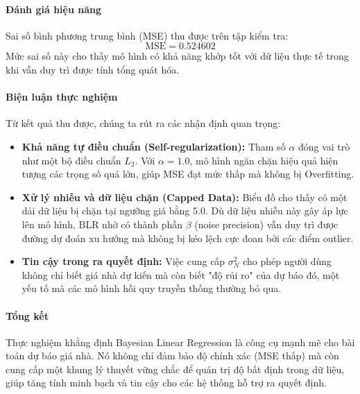 \paragraph{Đánh giá hiệu năng}

Sai số bình phương trung bình (MSE) thu được trên tập kiểm tra:
\[
\text{MSE} = 0.524602
\]
Mức sai số này cho thấy mô hình có khả năng khớp tốt với dữ liệu thực tế trong khi vẫn duy trì được tính tổng quát hóa.

\paragraph{Biện luận thực nghiệm}

Từ kết quả thu được, chúng ta rút ra các nhận định quan trọng:
\begin{itemize}
    \item \textbf{Khả năng tự điều chuẩn (Self-regularization):} Tham số $\alpha$ đóng vai trò như một bộ điều chuẩn $L_2$. Với $\alpha=1.0$, mô hình ngăn chặn hiệu quả hiện tượng các trọng số quá lớn, giúp MSE đạt mức thấp mà không bị Overfitting.
    \item \textbf{Xử lý nhiễu và dữ liệu chặn (Capped Data):} Biểu đồ cho thấy có một dải dữ liệu bị chặn tại ngưỡng giá bằng 5.0. Dù dữ liệu nhiễu này gây áp lực lên mô hình, BLR nhờ có thành phần $\beta$ (noise precision) vẫn duy trì được đường dự đoán xu hướng mà không bị kéo lệch cực đoan bởi các điểm outlier.
    \item \textbf{Tin cậy trong ra quyết định:} Việc cung cấp $\sigma_N^2$ cho phép người dùng không chỉ biết giá nhà dự kiến mà còn biết "độ rủi ro" của dự báo đó, một yếu tố mà các mô hình hồi quy truyền thống thường bỏ qua.
\end{itemize}

\paragraph{Tổng kết}

Thực nghiệm khẳng định Bayesian Linear Regression là công cụ mạnh mẽ cho bài toán dự báo giá nhà. Nó không chỉ đảm bảo độ chính xác (MSE thấp) mà còn cung cấp một khung lý thuyết vững chắc để quản trị độ bất định trong dữ liệu, giúp tăng tính minh bạch và tin cậy cho các hệ thống hỗ trợ ra quyết định.